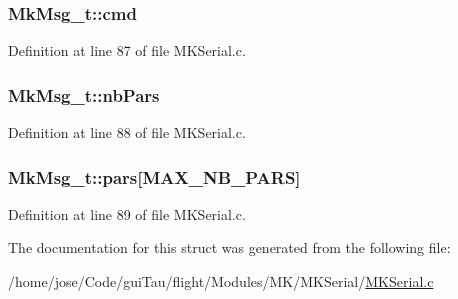 \hypertarget{struct_mk_msg__t_a03343f7f307a0c9df26f50ff4974daf0}{
\subsubsection[{cmd}]{ Mk\-Msg\-\_\-t\-::cmd}}\label{struct_mk_msg__t_a03343f7f307a0c9df26f50ff4974daf0}


Definition at line 87 of file M\-K\-Serial.\-c.

\hypertarget{struct_mk_msg__t_a337c996160a8982a0cb29aa03c25f676}{
\subsubsection[{nb\-Pars}]{ Mk\-Msg\-\_\-t\-::nb\-Pars}}\label{struct_mk_msg__t_a337c996160a8982a0cb29aa03c25f676}


Definition at line 88 of file M\-K\-Serial.\-c.

\hypertarget{struct_mk_msg__t_a8109c60d8ae790fa37e43d2e3d379a01}{
\subsubsection[{pars}]{ Mk\-Msg\-\_\-t\-::pars\mbox{[}M\-A\-X\-\_\-\-N\-B\-\_\-\-P\-A\-R\-S\mbox{]}}}\label{struct_mk_msg__t_a8109c60d8ae790fa37e43d2e3d379a01}


Definition at line 89 of file M\-K\-Serial.\-c.



The documentation for this struct was generated from the following file\-:\begin{DoxyCompactItemize}
\item 
/home/jose/\-Code/gui\-Tau/flight/\-Modules/\-M\-K/\-M\-K\-Serial/\hyperlink{_m_k_serial_8c}{M\-K\-Serial.\-c}\end{DoxyCompactItemize}
